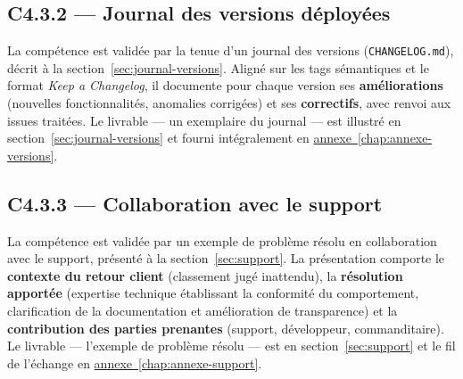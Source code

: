 \subsection*{C4.3.2 --- Journal des versions déployées}
La compétence est validée par la tenue d'un journal des versions (\texttt{CHANGELOG.md}), décrit à la section~\ref*{sec:journal-versions}. Aligné sur les tags sémantiques et le format \emph{Keep a Changelog}, il documente pour chaque version ses \textbf{améliorations} (nouvelles fonctionnalités, anomalies corrigées) et ses \textbf{correctifs}, avec renvoi aux issues traitées. Le livrable — un exemplaire du journal — est illustré en section~\ref*{sec:journal-versions} et fourni intégralement en \hyperref[chap:annexe-versions]{annexe~\ref*{chap:annexe-versions}}.

\subsection*{C4.3.3 --- Collaboration avec le support}
La compétence est validée par un exemple de problème résolu en collaboration avec le support, présenté à la section~\ref*{sec:support}. La présentation comporte le \textbf{contexte du retour client} (classement jugé inattendu), la \textbf{résolution apportée} (expertise technique établissant la conformité du comportement, clarification de la documentation et amélioration de transparence) et la \textbf{contribution des parties prenantes} (support, développeur, commanditaire). Le livrable — l'exemple de problème résolu — est en section~\ref*{sec:support} et le fil de l'échange en \hyperref[chap:annexe-support]{annexe~\ref*{chap:annexe-support}}.
